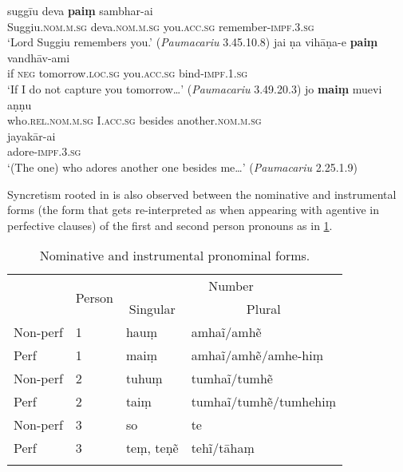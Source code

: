 \documentclass[output=paper,
modfonts
]{LSP/langsci}
\begin{document}
\begin{exe}
\ex\label{ex:stu}
\begin{xlist}
\ex \gll suggīu deva \textbf{paiṃ} sambhar-ai \\
Suggiu.\textsc{nom.m.sg} deva.\textsc{nom.m.sg} you.\textsc{acc.sg} remember-\textsc{impf.3.sg} \\
\glt `Lord Suggiu remembers you.'  (\textit{Paumacariu} 3.45.10.8)
\ex \gll jai ṇa vihāṇa-e \textbf{paiṃ} vandhāv-ami \\
if \textsc{neg} tomorrow.\textsc{loc.sg} you.\textsc{acc.sg} bind-\textsc{impf.1.sg} \\
\glt `If I do not capture you tomorrow\dots{}' (\textit{Paumacariu} 3.49.20.3)
\ex \gll jo \textbf{maiṃ} muevi aṇṇu \\
who.\textsc{rel.nom.m.sg} I.\textsc{acc.sg} besides another.\textsc{nom.m.sg} \\

\gll jayakār-ai \\
adore-\textsc{impf.3.sg} \\
\glt `(The one) who adores another one besides me\dots{}'  (\textit{Paumacariu}  2.25.1.9)
\end{xlist}
\end{exe}



Syncretism rooted in  is also observed
between  the nominative and instrumental forms (the  form that gets re-interpreted as  when appearing with agentive  in perfective clauses) of the first and second
person  pronouns as in \cref{tab:nominst}.

\begin{table}
\begin{tabular}[t]{llll}
\lsptoprule
\multicolumn{1}{c}{\multirow{2}{*}{Aspect}} & \multicolumn{1}{c}{\multirow{2}{*}{Person}} & \multicolumn{2}{c}{Number}\\ \cmidrule{3-4}
& & \multicolumn{1}{c}{Singular} & \multicolumn{1}{c}{Plural} \\
\midrule
Non-perf & 1   & hauṃ & amhaĩ/amhẽ\\
Perf & 1  &  maiṃ &  amhaĩ/amhẽ/amhe-hiṃ \\
Non-perf & 2  & tuhuṃ & tumhaĩ/tumhẽ \\
Perf & 2 & taiṃ & tumhaĩ/tumhẽ/tumhehiṃ\\
Non-perf & 3  & so & te \\
Perf & 3  & teṃ, teṇẽ  & tehĩ/tāhaṃ \\
\lspbottomrule
\end{tabular}
\caption{Nominative and instrumental pronominal forms.}
\label{tab:nominst}
\end{table}
\end{document}
